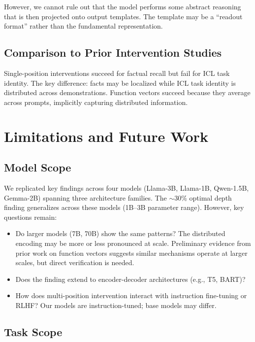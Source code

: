 \documentclass{article}
\begin{document}
However, we cannot rule out that the model performs some abstract reasoning that is then projected onto output templates. The template may be a ``readout format'' rather than the fundamental representation.

\subsection{Comparison to Prior Intervention Studies}

Single-position interventions succeed for factual recall \citep{meng2022locating} but fail for ICL task identity. The key difference: facts may be localized while ICL task identity is distributed across demonstrations. Function vectors \citep{todd2023function} succeed because they average across prompts, implicitly capturing distributed information.

\section{Limitations and Future Work}
\label{app:limitations}

\subsection{Model Scope}

We replicated key findings across four models (Llama-3B, Llama-1B, Qwen-1.5B, Gemma-2B) spanning three architecture families. The $\sim$30\% optimal depth finding generalizes across these models (1B--3B parameter range). However, key questions remain:
\begin{itemize}
    \item Do larger models (7B, 70B) show the same patterns? The distributed encoding may be more or less pronounced at scale. Preliminary evidence from prior work on function vectors \citep{todd2023function} suggests similar mechanisms operate at larger scales, but direct verification is needed.
    \item Does the finding extend to encoder-decoder architectures (e.g., T5, BART)?
    \item How does multi-position intervention interact with instruction fine-tuning or RLHF? Our models are instruction-tuned; base models may differ.
\end{itemize}

\subsection{Task Scope}
\end{document}
